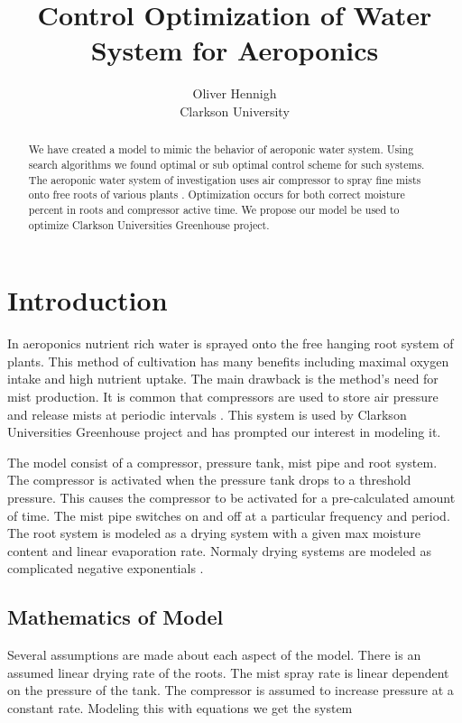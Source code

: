 \documentclass[a4paper,12pt]{article}
\begin{document}
\title{Control Optimization of Water System for Aeroponics}
\author{Oliver Hennigh \\
Clarkson University}
\renewcommand{\today}{}

\maketitle

\newtheorem*{t1}{Theorem}
\newtheorem*{t3}{Lemma}
\newtheorem*{t2}{Definition}

\begin{abstract}
		  We have created a model to mimic the behavior of aeroponic water system. Using search algorithms we found optimal or sub optimal control scheme for such systems. The aeroponic water system of investigation uses air compressor to spray fine mists onto free roots of various plants \cite{schorr1985method}. Optimization occurs for both correct moisture percent in roots and compressor active time. We propose our model be used to optimize Clarkson Universities Greenhouse project.
\end{abstract}


\section{Introduction}

In aeroponics nutrient rich water is sprayed onto the free hanging root system of plants. This method of cultivation has many benefits including maximal oxygen intake and high nutrient uptake. The main drawback is the method's need for mist production. It is common that compressors are used to store air pressure and release mists at periodic intervals \cite{schorr1985method}. This system is used by Clarkson Universities Greenhouse project and has prompted our interest in modeling it. 

The model consist of a compressor, pressure tank, mist pipe and root system. The compressor is activated when the pressure tank drops to a threshold pressure. This causes the compressor to be activated for a pre-calculated amount of time. The mist pipe switches on and off at a particular frequency and period. The root system is modeled as a drying system with a given max moisture content and linear evaporation rate. Normaly drying systems are modeled as complicated negative exponentials \cite{amer2003new} \cite{mujumdar2000fundamental}.

\subsection{Mathematics of Model}
Several assumptions are made about each aspect of the model. There is an assumed linear drying rate of the roots. The mist spray rate is linear dependent on the pressure of the tank. The compressor is assumed to increase pressure at a constant rate. Modeling this with equations we get the system
\end{document}

